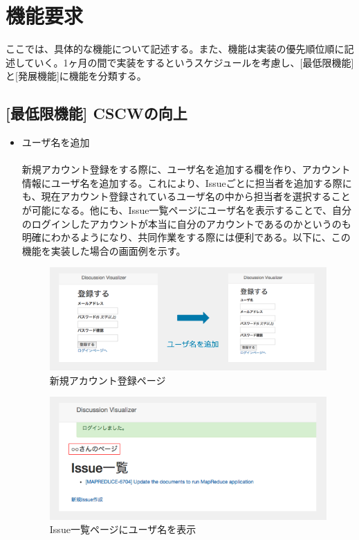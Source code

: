 \documentclass[12pt, oneside]{jreport}
\begin{document}
	\section{機能要求}
	ここでは、具体的な機能について記述する。また、機能は実装の優先順位順に記述していく。1ヶ月の間で実装をするというスケジュールを考慮し、[最低限機能]と[発展機能]に機能を分類する。
	
		\subsection{[最低限機能] CSCWの向上}
		\begin{itemize}
			\item ユーザ名を追加
			\\ \\
			新規アカウント登録をする際に、ユーザ名を追加する欄を作り、アカウント情報にユーザ名を追加する。これにより、Issueごとに担当者を追加する際にも、現在アカウント登録されているユーザ名の中から担当者を選択することが可能になる。他にも、Issue一覧ページにユーザ名を表示することで、自分のログインしたアカウントが本当に自分のアカウントであるのかというのも明確にわかるようになり、共同作業をする際には便利である。以下に、この機能を実装した場合の画面例を示す。
			
			\begin{figure}[H]
			\centering
			\includegraphics[width=17cm,bb=520 300 -200 27]{UserName1.png}
			\caption{新規アカウント登録ページ}
			\end{figure}
			
			\begin{figure}[H]
			\centering
			\includegraphics[width=17cm,bb=400 300 -200 27]{UserName2.png}
			\caption{Issue一覧ページにユーザ名を表示}
			\end{figure}
		

\end{itemize}
\end{document}
